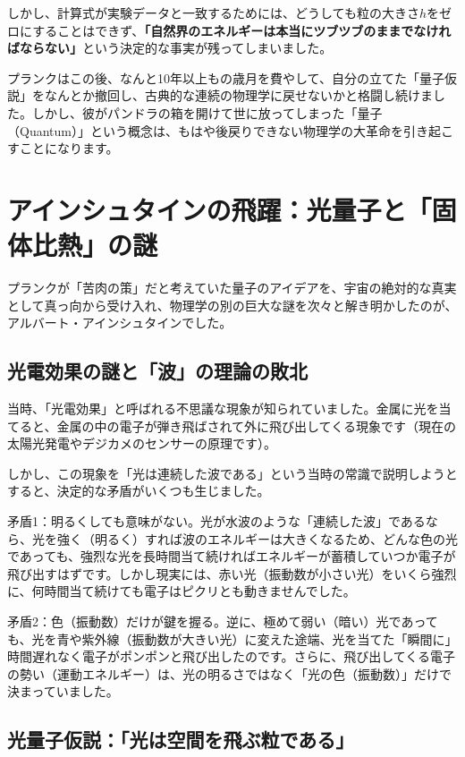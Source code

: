 しかし、計算式が実験データと一致するためには、どうしても粒の大きさ\(h\)をゼロにすることはできず、\textbf{「自然界のエネルギーは本当にツブツブのままでなければならない」}という決定的な事実が残ってしまいました。

プランクはこの後、なんと10年以上もの歳月を費やして、自分の立てた「量子仮説」をなんとか撤回し、古典的な連続の物理学に戻せないかと格闘し続けました。しかし、彼がパンドラの箱を開けて世に放ってしまった「量子（Quantum）」という概念は、もはや後戻りできない物理学の大革命を引き起こすことになります。

\section{アインシュタインの飛躍：光量子と「固体比熱」の謎}

プランクが「苦肉の策」だと考えていた量子のアイデアを、宇宙の絶対的な真実として真っ向から受け入れ、物理学の別の巨大な謎を次々と解き明かしたのが、アルバート・アインシュタインでした。

\subsection{光電効果の謎と「波」の理論の敗北}

当時、「光電効果」と呼ばれる不思議な現象が知られていました。金属に光を当てると、金属の中の電子が弾き飛ばされて外に飛び出してくる現象です（現在の太陽光発電やデジカメのセンサーの原理です）。

しかし、この現象を「光は連続した波である」という当時の常識で説明しようとすると、決定的な矛盾がいくつも生じました。

矛盾1：明るくしても意味がない。光が水波のような「連続した波」であるなら、光を強く（明るく）すれば波のエネルギーは大きくなるため、どんな色の光であっても、強烈な光を長時間当て続ければエネルギーが蓄積していつか電子が飛び出すはずです。しかし現実には、赤い光（振動数が小さい光）をいくら強烈に、何時間当て続けても電子はピクリとも動きませんでした。

矛盾2：色（振動数）だけが鍵を握る。逆に、極めて弱い（暗い）光であっても、光を青や紫外線（振動数が大きい光）に変えた途端、光を当てた「瞬間に」時間遅れなく電子がポンポンと飛び出したのです。さらに、飛び出してくる電子の勢い（運動エネルギー）は、光の明るさではなく「光の色（振動数）」だけで決まっていました。

\subsection{光量子仮説：「光は空間を飛ぶ粒である」}

